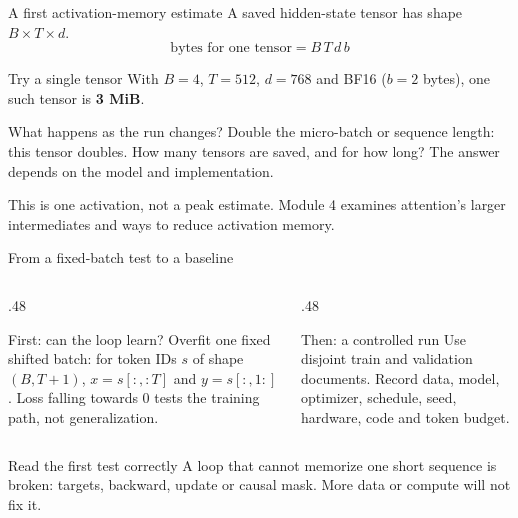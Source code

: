 \documentclass[handout]{beamer}
\begin{document}
\begin{frame}{A first activation-memory estimate}
  \small A saved hidden-state tensor has shape $B\times T\times d$.
  \[
    \text{bytes for one tensor}=B\,T\,d\,b
  \]
  \begin{block}{Try a single tensor}
    With $B=4$, $T=512$, $d=768$ and BF16 ($b=2$ bytes), one such tensor is \textbf{3 MiB}.
  \end{block}
  \begin{alertblock}{What happens as the run changes?}
    Double the micro-batch or sequence length: this tensor doubles. How many tensors are saved, and for how long? The answer depends on the model and implementation.
  \end{alertblock}
  \footnotesize This is one activation, not a peak estimate. Module 4 examines attention's larger intermediates and ways to reduce activation memory.
\end{frame}

\begin{frame}{From a fixed-batch test to a baseline}
  \begin{columns}[t]
    \begin{column}{.48\linewidth}
      \begin{block}{First: can the loop learn?}
        Overfit one fixed shifted batch: for token IDs $s$ of shape $(B,T{+}1)$, $x=s[:,:T]$ and $y=s[:,1:]$. Loss falling towards 0 tests the training path, not generalization.
      \end{block}
    \end{column}
    \begin{column}{.48\linewidth}
      \begin{block}{Then: a controlled run}
        Use disjoint train and validation documents. Record data, model, optimizer, schedule, seed, hardware, code and token budget.
      \end{block}
    \end{column}
  \end{columns}
  \vfill
  \begin{alertblock}{Read the first test correctly}
    A loop that cannot memorize one short sequence is broken: targets, backward, update or causal mask. More data or compute will not fix it.
  \end{alertblock}
\end{frame}
\end{document}
